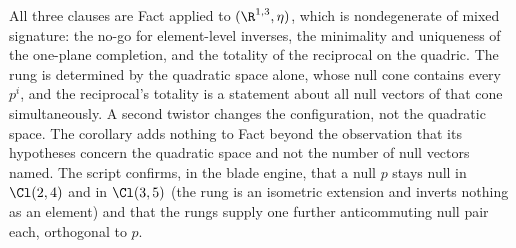 All three clauses are Fact  applied to $(\R^{1,3}, \eta)$, which is nondegenerate of mixed signature: the no-go for element-level inverses, the minimality and uniqueness of the one-plane completion, and the totality of the reciprocal on the quadric. The rung is determined by the quadratic space alone, whose null cone contains every $p^{i}$, and the reciprocal's totality is a statement about all null vectors of that cone simultaneously. A second twistor changes the configuration, not the quadratic space. The corollary adds nothing to Fact  beyond the observation that its hypotheses concern the quadratic space and not the number of null vectors named. The script confirms, in the blade engine, that a null $p$ stays null in $\Cl(2,4)$ and in $\Cl(3,5)$ (the rung is an isometric extension and inverts nothing as an element) and that the rungs supply one further anticommuting null pair each, orthogonal to $p$.
